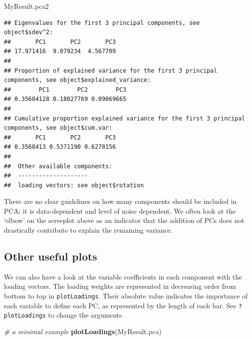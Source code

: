 \documentclass[]{book}
\newenvironment{Shaded}{\begin{snugshade}}{\end{snugshade}}
\newcommand{\CommentTok}[1]{\textcolor[rgb]{0.56,0.35,0.01}{\textit{#1}}}
\newcommand{\KeywordTok}[1]{\textcolor[rgb]{0.13,0.29,0.53}{\textbf{#1}}}
\newcommand{\NormalTok}[1]{#1}
\begin{document}
\begin{Shaded}
\begin{Highlighting}[]
\NormalTok{MyResult.pca2}
\end{Highlighting}
\end{Shaded}

\begin{verbatim}
## Eigenvalues for the first 3 principal components, see object$sdev^2: 
##       PC1       PC2       PC3 
## 17.971416  9.079234  4.567709 
## 
## Proportion of explained variance for the first 3 principal components, see object$explained_variance: 
##        PC1        PC2        PC3 
## 0.35684128 0.18027769 0.09069665 
## 
## Cumulative proportion explained variance for the first 3 principal components, see object$cum.var: 
##       PC1       PC2       PC3 
## 0.3568413 0.5371190 0.6278156 
## 
##  Other available components: 
##  -------------------- 
##  loading vectors: see object$rotation
\end{verbatim}

There are no clear guidelines on how many components should be included in PCA: it is data-dependent and level of noise dependent. We often look at the `elbow' on the screeplot above as an indicator that the addition of PCs does not drastically contribute to explain the remaining variance.

\hypertarget{other-useful-plots}{%
\subsection{Other useful plots}\label{other-useful-plots}}

We can also have a look at the variable coefficients in each component with the loading vectors. The loading weights are represented in decreasing order from bottom to top in \texttt{plotLoadings}. Their absolute value indicates the importance of each variable to define each PC, as represented by the length of each bar. See \texttt{?plotLoadings} to change the arguments.

\begin{Shaded}
\begin{Highlighting}[]
\CommentTok{# a minimal example}
\KeywordTok{plotLoadings}\NormalTok{(MyResult.pca)}
\end{Highlighting}
\end{Shaded}
\end{document}
